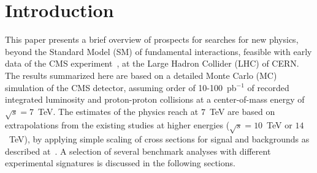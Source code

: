 \documentclass{cmspaper}
\begin{document}
\section{Introduction}
This paper presents a brief overview of prospects for searches for new physics, 
beyond the Standard Model (SM) of fundamental interactions, feasible with early data of the 
CMS experiment~\cite{CMS:2008zzk}, at the Large Hadron Collider (LHC) of CERN.
The results summarized here are based on a detailed Monte Carlo (MC) simulation of 
the CMS detector, assuming order of 10-100~pb$^{-1}$ 
of recorded integrated luminosity and proton-proton collisions 
at a center-of-mass energy of $\sqrt{s} = 7$~TeV. 
The estimates of the physics reach at $7$~TeV are based on extrapolations from the existing studies 
at higher energies ($\sqrt{s} = 10$~TeV or $14$~TeV), 
by applying simple scaling of cross sections for signal and backgrounds as described 
at~\cite{CMSPhysicsReach7TeV}. A selection of several benchmark analyses with different experimental 
signatures is discussed in the following sections.
\end{document}
